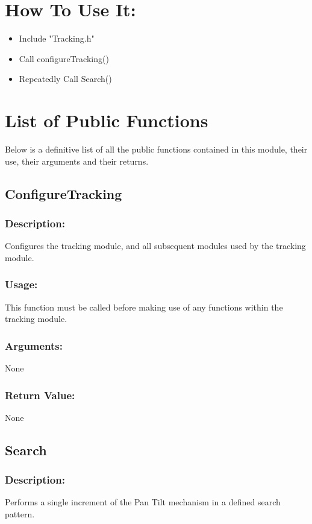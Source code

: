 \documentclass[]{report}
\begin{document}
\section{How To Use It:}
\begin{itemize}
	\item Include "Tracking.h"
	\item Call configureTracking()
	\item Repeatedly Call Search()
\end{itemize}

\section{List of Public Functions}
Below is a definitive list of all the public functions contained in this module, their use, their arguments and their returns.

\subsection{ConfigureTracking}
\subsubsection{Description:}
Configures the tracking module, and all subsequent modules used by the tracking module.

\subsubsection{Usage:}
This function must be called before making use of any functions within the tracking module.

\subsubsection{Arguments:}
None

\subsubsection{Return Value:}
None

\subsection{Search}
\subsubsection{Description:}
Performs a single increment of the Pan Tilt mechanism in a defined search pattern.
\end{document}
